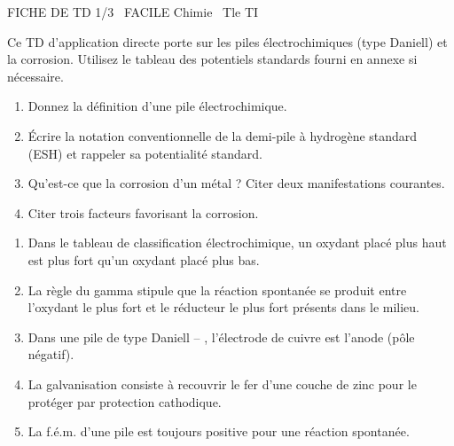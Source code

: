 \documentclass[11pt]{article}
\begin{document}
\begin{tcolorbox}[enhanced,colback=popink,colframe=popink,arc=10pt,boxrule=0pt,left=12pt,right=12pt,top=9pt,bottom=9pt]
{\color{white}\popxbold\small FICHE DE TD 1/3 \textbullet\ FACILE \hfill Chimie \textbullet\ Tle TI\par}
\end{tcolorbox}
\vspace{4pt}
\noindent Ce TD d'application directe porte sur les piles électrochimiques (type Daniell) et la corrosion. Utilisez le tableau des potentiels standards fourni en annexe si nécessaire.

\begin{exercice}
\begin{enumerate}
    \item Donnez la définition d'une pile électrochimique.
    \item Écrire la notation conventionnelle de la demi-pile à hydrogène standard (ESH) et rappeler sa potentialité standard.
    \item Qu'est-ce que la corrosion d'un métal ? Citer deux manifestations courantes.
    \item Citer trois facteurs favorisant la corrosion.
\end{enumerate}
\end{exercice}

\begin{exercice}
\begin{enumerate}
    \item Dans le tableau de classification électrochimique, un oxydant placé plus haut est plus fort qu'un oxydant placé plus bas.
    \item La règle du gamma stipule que la réaction spontanée se produit entre l'oxydant le plus fort et le réducteur le plus fort présents dans le milieu.
    \item Dans une pile de type Daniell  -- , l'électrode de cuivre est l'anode (pôle négatif).
    \item La galvanisation consiste à recouvrir le fer d'une couche de zinc pour le protéger par protection cathodique.
    \item La f.é.m. d'une pile est toujours positive pour une réaction spontanée.
\end{enumerate}
\end{exercice}
\end{document}
